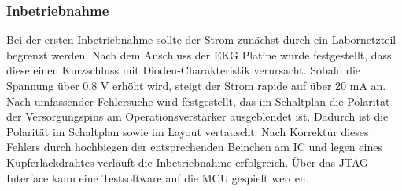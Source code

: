 \subsubsection{Inbetriebnahme}
Bei der ersten Inbetriebnahme sollte der Strom zunächst durch ein Labornetzteil begrenzt werden. Nach dem Anschluss der EKG Platine wurde festgestellt, dass diese einen Kurzschluss mit Dioden-Charakteristik verursacht. Sobald die Spannung über 0,8 V erhöht wird, steigt der Strom rapide auf über 20 mA an. Nach umfassender Fehlersuche wird festgestellt, das im Schaltplan die Polarität der Versorgungspins am Operationsverstärker ausgeblendet ist. Dadurch ist die Polarität im Schaltplan sowie im Layout vertauscht. Nach Korrektur dieses Fehlers durch hochbiegen der entsprechenden Beinchen am IC und legen eines Kupferlackdrahtes verläuft die Inbetriebnahme erfolgreich. Über das JTAG Interface kann eine Testsoftware auf die MCU gespielt werden.